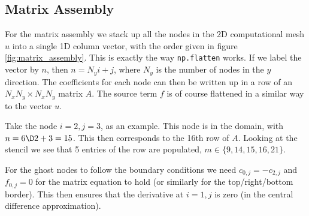 \documentclass[sigconf]{acmart}
\begin{document}
\subsection{Matrix Assembly}
For the matrix assembly we stack up all the nodes in the 2D computational mesh $ u $ into a single 1D column vector, with the order given in figure \ref{fig:matrix_assembly}. This is exactly the way \texttt{np.flatten} works. If we label the vector by $ n $, then $ n = N_y i + j $, where $ N_y $ is the number of nodes in the $ y $ direction. The coefficients for each node can then be written up in a row of an $ N_xN_y \times N_x N_y $ matrix $ A $. The source term $ f $ is of course flattened in a similar way to the vector $ u $.

Take the node $ i=2, j=3 $, as an example. This node is in the domain, with $ n=6\D2+3 = 15 $. This then corresponds to the 16th row of $ A $. Looking at the stencil we see that 5 entries of the row are populated, $ m \in \{9, 14, 15, 16, 21\} $.

For the ghost nodes to follow the boundary conditions we need $ c_{0,j} = - c_{2,j} $ and $ f_{0,j}=0 $ for the matrix equation to hold (or similarly for the top/right/bottom border). This then ensures that the derivative at $ i=1, j $ is zero (in the central difference approximation).
\end{document}
